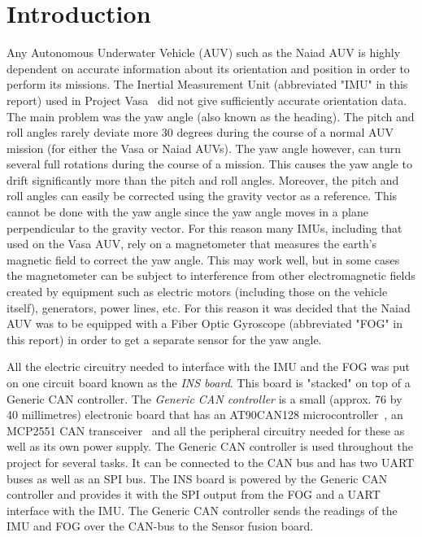\section{Introduction}\label{sec:introduction}
Any Autonomous Underwater Vehicle (AUV) such as the Naiad AUV is highly dependent on accurate information about its orientation and position in order to perform its missions. The Inertial Measurement Unit (abbreviated "IMU" in this report) used in Project Vasa~\cite{unpublished:vasa} did not give sufficiently accurate orientation data. The main problem was the yaw angle (also known as the heading). \newline
The pitch and roll angles rarely deviate more 30 degrees during the course of a normal AUV mission (for either the Vasa or Naiad AUVs). The yaw angle however, can turn several full rotations during the course of a mission. This causes the yaw angle to drift significantly more than the pitch and roll angles. Moreover, the pitch and roll angles can easily be corrected using the gravity vector as a reference. This cannot be done with the yaw angle since the yaw angle moves in a plane perpendicular to the gravity vector. \newline
For this reason many IMUs, including that used on the Vasa AUV, rely on a magnetometer that measures the earth's magnetic field to correct the yaw angle. This may work well, but in some cases the magnetometer can be subject to interference from other electromagnetic fields created by equipment such as electric motors (including those on the vehicle itself), generators, power lines, etc. For this reason it was decided that the Naiad AUV was to be equipped with a Fiber Optic Gyroscope (abbreviated "FOG" in this report) in order to get a separate sensor for the yaw angle.

All the electric circuitry needed to interface with the IMU and the FOG was put on one circuit board known as the \emph{INS board}. This board is "stacked" on top of a Generic CAN controller. The \emph{Generic CAN controller} is a small (approx. 76 by 40 millimetres) electronic board that has an AT90CAN128 microcontroller~\cite{web:at90can}, an MCP2551 CAN transceiver~\cite{web:mcp2551} and all the peripheral circuitry needed for these as well as its own power supply. The Generic CAN controller is used throughout the project for several tasks. It can be connected to the CAN bus and has two UART buses as well as an SPI bus. \newline
The INS board is powered by the Generic CAN controller and provides it with the SPI output from the FOG and a UART interface with the IMU. The Generic CAN controller sends the readings of the IMU and FOG over the CAN-bus to the Sensor fusion board.
